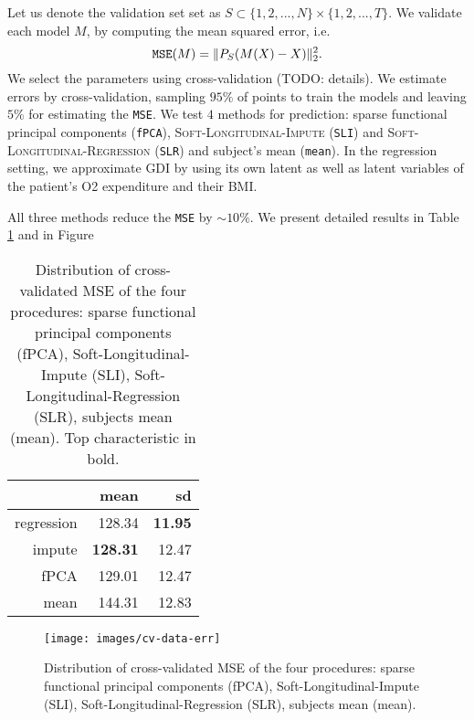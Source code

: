 \documentclass[preprint]{imsart}
\numberwithin{equation}{section}
\theoremstyle{plain}
\begin{document}
Let us denote the validation set set as $S \subset \{1,2,...,N\} \times \{1,2,...,T\}$. We validate each model $M$, by computing the mean squared error, i.e.
\[
\verb|MSE|(M) = \|P_S(M(X) - X)\|_2^2.
\]
We select the parameters using cross-validation (TODO: details). We estimate errors by cross-validation, sampling $95\%$ of points to train the models and leaving $5\%$ for estimating the \verb|MSE|. We test $4$ methods for prediction: sparse functional principal components (\verb|fPCA|), \textsc{Soft-Longitudinal-Impute} (\verb|SLI|) and \textsc{Soft-Longitudinal-Regression} (\verb|SLR|) and subject's mean (\verb|mean|). In the regression setting, we approximate GDI by using its own latent as well as latent variables of the patient's O2 expenditure and their BMI.

All three methods reduce the \verb|MSE| by $\sim 10\%$. We present detailed results in Table \ref{tbl:data-res} and in Figure

\begin{table}[ht]
\centering
\begin{tabular}{rrr}
  \hline
 & mean & sd \\ 
  \hline
regression & 128.34 & \textbf{11.95} \\ 
  impute & \textbf{128.31} & 12.47 \\ 
  fPCA & 129.01 & 12.47 \\ 
  mean & 144.31 & 12.83 \\ 
   \hline
\end{tabular}\label{tbl:data-res}
\caption{Distribution of cross-validated MSE of the four procedures: sparse functional principal components (fPCA), Soft-Longitudinal-Impute (SLI), Soft-Longitudinal-Regression (SLR), subjects mean (mean). Top characteristic in bold.}
\end{table}

\begin{figure}[h]
  \texttt{[image: images/cv-data-err]}
  \caption{Distribution of cross-validated MSE of the four procedures: sparse functional principal components (fPCA), Soft-Longitudinal-Impute (SLI), Soft-Longitudinal-Regression (SLR), subjects mean (mean).}
  \label{fig:Boxplots}
\end{figure}


\end{document}
